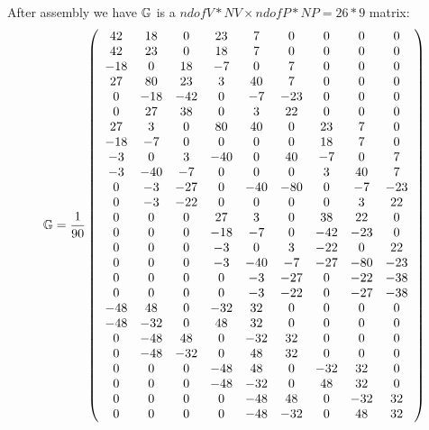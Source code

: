 After assembly we have ${\mathbb{G}}$ is a $ndofV*NV\times ndofP*NP=26*9$ matrix:
\[
{\mathbb{G}}=
\frac{1}{90}
\left(
\begin{array}{ccccccccc}
 42  &  18 &   0 &  23 &   7 &    0 &   0 &   0 &   0 \\ 
 42  &  23 &   0 &  18 &   7 &    0 &   0 &   0 &   0 \\ 
-18  &   0 &  18 &  -7 &   0 &    7 &   0 &   0 &   0 \\ 
 27  &  80 &  23 &   3 &  40 &    7 &   0 &   0 &   0 \\ 
  0  & -18 & -42 &   0 &  -7 &  -23 &   0 &   0 &   0 \\ 
  0  &  27 &  38 &   0 &   3 &   22 &   0 &   0 &   0 \\ 
 27  &   3 &   0 &  80 &  40 &    0 &  23 &   7 &   0 \\ 
-18  &  -7 &   0 &   0 &   0 &    0 &  18 &   7 &   0 \\ 
 -3  &   0 &   3 & -40 &   0 &   40 &  -7 &   0 &   7 \\ 
 -3  & -40 &  -7 &   0 &   0 &    0 &   3 &  40 &   7 \\ 
  0  &  -3 & -27 &   0 & -40 &  -80 &   0 &  -7 & -23 \\ 
  0  &  -3 & -22 &   0 &   0 &    0 &   0 &   3 &  22 \\ 
  0  &   0 &   0 &  27 &   3 &    0 &  38 &  22 &   0 \\ 
  0  &   0 &   0 & -18 &  -7 &    0 & -42 & -23 &   0 \\ 
  0  &   0 &   0 &  -3 &   0 &    3 & -22 &   0 &  22 \\ 
  0  &   0 &   0 &  -3 & -40 &   -7 & -27 & -80 & -23 \\ 
  0  &   0 &   0 &   0 &  -3 &  -27 &   0 & -22 & -38 \\ 
  0  &   0 &   0 &   0 &  -3 &  -22 &   0 & -27 & -38 \\ 
-48  &  48 &   0 & -32 &  32 &    0 &   0 &   0 &   0 \\ 
-48  & -32 &   0 &  48 &  32 &    0 &   0 &   0 &   0 \\ 
  0  & -48 &  48 &   0 & -32 &   32 &   0 &   0 &   0 \\ 
  0  & -48 & -32 &   0 &  48 &   32 &   0 &   0 &   0 \\ 
  0  &   0 &   0 & -48 &  48 &    0 & -32 &  32 &   0 \\ 
  0  &   0 &   0 & -48 & -32 &    0 &  48 &  32 &   0 \\ 
  0  &   0 &   0 &   0 & -48 &   48 &   0 & -32 &  32 \\ 
  0  &   0 &   0 &   0 & -48 &  -32 &   0 &  48 &  32 
\end{array}
\right)
\]

